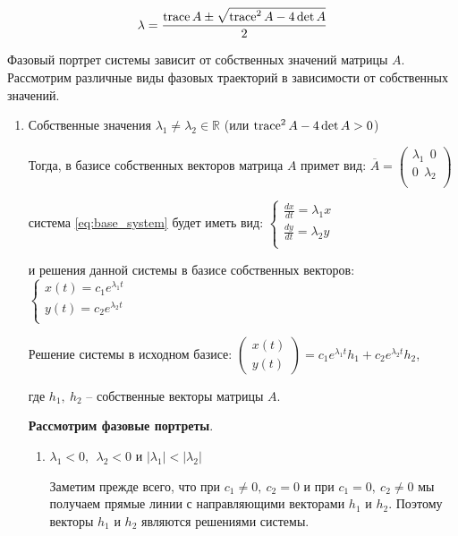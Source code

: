 \[ \lambda = \frac{\operatorname{trace} A \pm \sqrt{\operatorname{trace}^2 A - 4 \det A}}{2} \]

Фазовый портрет системы зависит от собственных значений матрицы $A$. Рассмотрим различные виды фазовых траекторий в зависимости от собственных значений.

\begin{enumerate}
  \item Собственные значения  $\lambda_1 \neq \lambda_2 \in \mathbb{R}$ (или $\operatorname{trace}^2 A - 4 \det A > 0$)
  
  Тогда, в базисе собственных векторов матрица $A$ примет вид:
  $\overline{A} = 
  \begin{pmatrix}
    \lambda_1 ~~ 0 \\
    0 ~~ \lambda_2 \\
  \end{pmatrix}$

  система \eqref{eq:base_system} будет иметь вид:
  $\begin{cases}
    \frac{d x}{d t} = \lambda_1 x \\
    \frac{d y}{d t} = \lambda_2 y \\        
  \end{cases}$

  и решения данной системы в базисе собственных векторов:
  $\begin{cases}
    x(t) = c_1 e^{\lambda_1 t} \\
    y(t) = c_2 e^{\lambda_2 t} \\
  \end{cases}$

  Решение системы в исходном базисе:
  $
   \begin{pmatrix}
     x(t) \\
     y(t)
   \end{pmatrix} 
   = c_1 e^{\lambda_1 t} h_1 + c_2 e^{\lambda_2 t} h_2
  $,

  где $h_1, ~ h_2$ -- собственные векторы матрицы $A$.
  
  \textbf{Рассмотрим фазовые портреты}.
  
  \begin{enumerate}
  	\item $\lambda_1 < 0, ~~ \lambda_2 < 0$ и $|\lambda_1| < |\lambda_2|$
  	
  	Заметим прежде всего, что при $c_1 \neq 0, ~ c_2 = 0$ и при $c_1 = 0, ~ c_2 \neq 0$ мы получаем прямые линии с направляющими векторами $h_1$ и $h_2$. Поэтому векторы $h_1$ и $h_2$ являются решениями системы.
  	

\end{enumerate}
\end{enumerate}
